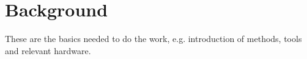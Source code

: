 \chapter{Background}
\label{sec:background}

These are the basics needed to do the work, e.g. introduction of methods, tools and relevant hardware.


